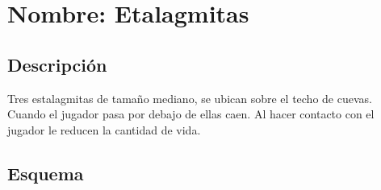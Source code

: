 \section{Nombre: Etalagmitas}\label{obs.rocas}
	\subsection{Descripción}
	Tres estalagmitas de tamaño mediano, se ubican sobre el techo de cuevas. Cuando el jugador pasa por debajo de ellas caen. Al hacer contacto con el jugador le reducen la cantidad de vida.
	\subsection{Esquema}
